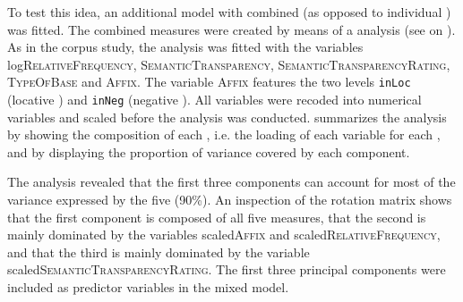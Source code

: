 To test this idea, an additional model with combined  (as opposed to individual ) was fitted. The combined measures were created by means of a  analysis (see  on ). 
As in the corpus study, the  analysis was fitted with the variables log\textsc{RelativeFrequency}, \textsc{SemanticTransparency}, \textsc{SemanticTransparencyRating}, \textsc{TypeOfBase} and \textsc{Affix}. The variable \textsc{Affix} features the two levels \texttt{inLoc} (locative ) and \texttt{inNeg} (negative ). All variables were recoded into numerical variables and scaled before the analysis was conducted. 
 summarizes the analysis by showing the composition of each , i.e. the loading of each variable for each , and by displaying the proportion of variance covered by each component. 










The  analysis revealed that the first three components can account for most of the variance expressed by the five  (90\%). An inspection of the rotation matrix shows that the first component is composed of all five measures, that the second is mainly dominated by the variables scaled\textsc{Affix} and scaled\textsc{RelativeFrequency}, and that the third is mainly dominated by the variable scaled\textsc{SemanticTransparencyRating}. 
The first three principal components were included as predictor variables in the mixed model.  




